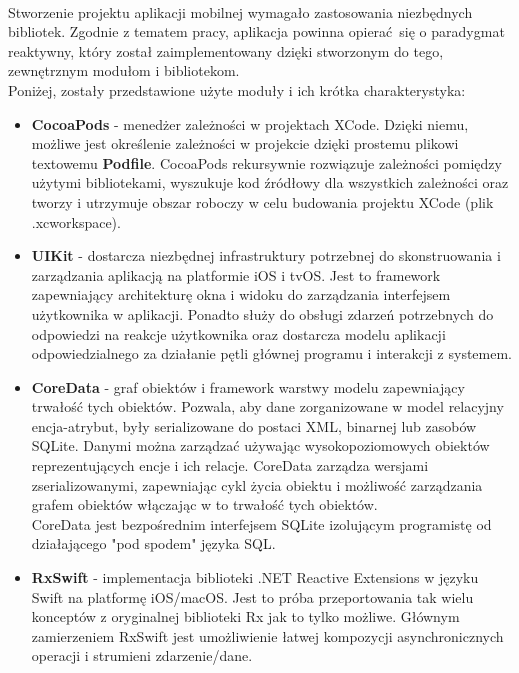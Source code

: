 \documentclass[12pt,oneside,a4paper]{report}
\begin{document}
\paragraph{}Stworzenie projektu aplikacji mobilnej wymagało zastosowania niezbędnych bibliotek. Zgodnie z tematem pracy, aplikacja powinna opierać się o paradygmat reaktywny, który został zaimplementowany dzięki stworzonym do tego, zewnętrznym modułom i bibliotekom. \\
Poniżej, zostały przedstawione użyte moduły i ich krótka charakterystyka:
\begin{itemize}
	\item  \textbf{CocoaPods} - menedżer zależności w projektach XCode. Dzięki niemu, możliwe jest określenie zależności w projekcie dzięki prostemu plikowi textowemu \textbf{Podfile}. CocoaPods rekursywnie rozwiązuje zależności pomiędzy użytymi bibliotekami, wyszukuje kod źródłowy dla wszystkich zależności oraz tworzy i utrzymuje obszar roboczy w celu budowania projektu XCode (plik .xcworkspace).\cite{cocoaPods}
	\item  \textbf{UIKit} - dostarcza niezbędnej infrastruktury potrzebnej do skonstruowania i zarządzania aplikacją na platformie iOS i tvOS. Jest to framework zapewniający architekturę okna i widoku do zarządzania interfejsem użytkownika w aplikacji. Ponadto służy do obsługi zdarzeń potrzebnych do odpowiedzi na reakcje użytkownika oraz dostarcza modelu aplikacji odpowiedzialnego za działanie pętli głównej programu i interakcji z systemem.\cite{UIKit}
	\item  \textbf{CoreData} - graf obiektów\cite{objectGraph} i framework warstwy modelu zapewniający trwałość tych obiektów.
	Pozwala, aby dane zorganizowane w model relacyjny encja-atrybut, były serializowane do postaci XML, binarnej lub zasobów SQLite.
	Danymi można zarządzać używając wysokopoziomowych obiektów reprezentujących encje i ich relacje. CoreData zarządza wersjami zserializowanymi, zapewniając cykl życia obiektu i możliwość zarządzania grafem obiektów włączając w to trwałość tych obiektów.\\
	CoreData jest bezpośrednim interfejsem SQLite izolującym programistę od działającego "pod spodem" języka SQL.
	
	\item  \textbf{RxSwift} - implementacja biblioteki .NET Reactive Extensions w języku Swift na platformę iOS/macOS. Jest to próba przeportowania tak wielu konceptów z oryginalnej biblioteki Rx jak to tylko możliwe. Głównym zamierzeniem RxSwift jest umożliwienie łatwej kompozycji asynchronicznych operacji i strumieni zdarzenie/dane.
	

\end{itemize}
\end{document}
